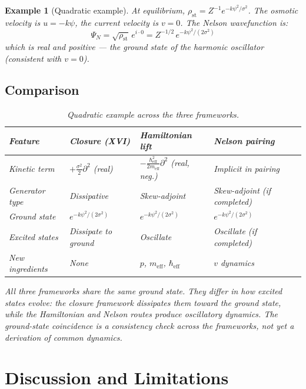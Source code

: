 \documentclass[12pt]{article}
\newtheorem{example}[theorem]{Example}
\begin{document}
\begin{example}[Quadratic example]
At equilibrium, $\rho_{\mathrm{st}} = Z^{-1}e^{-k\psi^2/\sigma^2}$. The osmotic velocity is $u = -k\psi$, the current velocity is $v = 0$. The Nelson wavefunction is:
\begin{equation}
    \Psi_N = \sqrt{\rho_{\mathrm{st}}}\, e^{i \cdot 0} = Z^{-1/2}\, e^{-k\psi^2/(2\sigma^2)}
\end{equation}
which is real and positive --- the ground state of the harmonic oscillator (consistent with $v = 0$).

\subsection*{Comparison}

\begin{table}[ht]
\centering
\caption{Quadratic example across the three frameworks.}
\label{tab:quadratic}
\begin{tabular}{@{}llll@{}}
\toprule
Feature & Closure (XVI) & Hamiltonian lift & Nelson pairing \\
\midrule
Kinetic term & $+\frac{\sigma^2}{2}\partial^2$ (real) & $-\frac{\hbar_{\mathrm{eff}}^2}{2m_{\mathrm{eff}}}\partial^2$ (real, neg.) & Implicit in pairing \\
Generator type & Dissipative & Skew-adjoint & Skew-adjoint (if completed) \\
Ground state & $e^{-k\psi^2/(2\sigma^2)}$ & $e^{-k\psi^2/(2\sigma^2)}$ & $e^{-k\psi^2/(2\sigma^2)}$ \\
Excited states & Dissipate to ground & Oscillate & Oscillate (if completed) \\
New ingredients & None & $p$, $m_{\mathrm{eff}}$, $\hbar_{\mathrm{eff}}$ & $v$ dynamics \\
\bottomrule
\end{tabular}
\end{table}

All three frameworks share the same ground state. They differ in how excited states evolve: the closure framework dissipates them toward the ground state, while the Hamiltonian and Nelson routes produce oscillatory dynamics. The ground-state coincidence is a consistency check across the frameworks, not yet a derivation of common dynamics.
\end{example}

\section{Discussion and Limitations}\label{sec:discussion}
\end{document}
